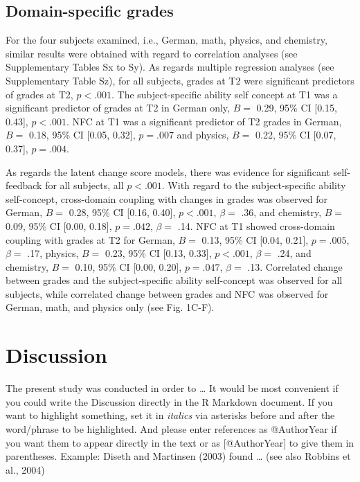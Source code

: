 \documentclass[
  man]{apa6}
\begin{document}
\hypertarget{domain-specific-grades}{%
\subsection{Domain-specific grades}\label{domain-specific-grades}}

For the four subjects examined, i.e., German, math, physics, and chemistry, similar results were obtained with regard to correlation analyses (see Supplementary Tables Sx to Sy). As regards multiple regression analyses (see Supplementary Table Sz), for all subjects, grades at T2 were significant predictors of grades at T2, \(p<.001\). The subject-specific ability self concept at T1 was a significant predictor of grades at T2 in German only, \(B=\) 0.29, 95\% CI {[}0.15, 0.43{]}, \(p< .001\). NFC at T1 was a significant predictor of T2 grades in German, \(B=\) 0.18, 95\% CI {[}0.05, 0.32{]}, \(p=.007\) and physics, \(B=\) 0.22, 95\% CI {[}0.07, 0.37{]}, \(p=.004\).

As regards the latent change score models, there was evidence for significant self-feedback for all subjects, all \(p<.001\). With regard to the subject-specific ability self-concept, cross-domain coupling with changes in grades was observed for German, \(B=\) 0.28, 95\% CI {[}0.16, 0.40{]}, \(p< .001\), \(\beta=\) .36, and chemistry, \(B=\) 0.09, 95\% CI {[}0.00, 0.18{]}, \(p=.042\), \(\beta=\) .14. NFC at T1 showed cross-domain coupling with grades at T2 for German, \(B=\) 0.13, 95\% CI {[}0.04, 0.21{]}, \(p=.005\), \(\beta=\) .17, physics, \(B=\) 0.23, 95\% CI {[}0.13, 0.33{]}, \(p< .001\), \(\beta=\) .24, and chemistry, \(B=\) 0.10, 95\% CI {[}0.00, 0.20{]}, \(p=.047\), \(\beta=\) .13. Correlated change between grades and the subject-specific ability self-concept was observed for all subjects, while correlated change between grades and NFC was observed for German, math, and physics only (see Fig. 1C-F).

\hypertarget{discussion}{%
\section{Discussion}\label{discussion}}

The present study was conducted in order to \ldots{} It would be most convenient if you could write the Discussion directly in the R Markdown document. If you want to highlight something, set it in \emph{italics} via asterisks before and after the word/phrase to be highlighted. And please enter references as @AuthorYear if you want them to appear directly in the text or as {[}@AuthorYear{]} to give them in parentheses. Example: Diseth and Martinsen (2003) found \ldots{} (see also Robbins et al., 2004)
\end{document}
